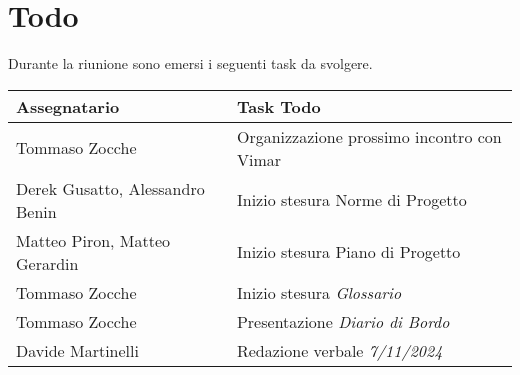 \section{Todo}
Durante la riunione sono emersi i seguenti task da svolgere.

\begin{center}
  \begin{tabular}{|p{5cm}|p{8cm}|}
    \hline
    \textbf{Assegnatario}       & \textbf{Task Todo} \\ \hline
        Tommaso Zocche & Organizzazione prossimo incontro con Vimar \\ \hline
        Derek Gusatto, Alessandro Benin & Inizio stesura Norme di Progetto \\ \hline
        Matteo Piron, Matteo Gerardin & Inizio stesura Piano di Progetto \\ \hline
        Tommaso Zocche & Inizio stesura \textit{Glossario} \\ \hline
        Tommaso Zocche & Presentazione \textit{Diario di Bordo} \\ \hline
        Davide Martinelli & Redazione verbale \textit{7/11/2024} \\ \hline
  \end{tabular}
\end{center}